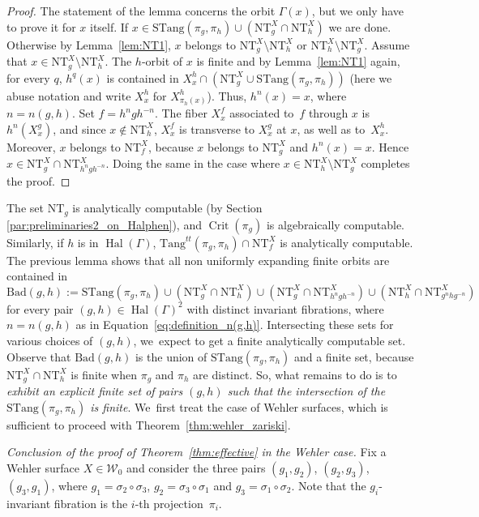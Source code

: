 \documentclass[11pt]{article}
\DeclareMathOperator{\Crit}{Crit}
\DeclareMathOperator{\Hal}{Hal}
\newcommand{\cW}{\mathcal{W}}
\newcommand{\Tang}{{\mathrm{Tang}}}
\newcommand{\STang}{{\mathrm{STang}}}
\newcommand{\NT}{{\mathrm{NT}}}
\theoremstyle{plain}
\theoremstyle{definition}
\numberwithin{equation}{section}
\begin{document}
\begin{proof}
The statement of the lemma concerns the orbit $\Gamma(x)$, but we only have to prove it for $x$ itself.
If $x\in \STang(\pi_g, \pi_h) \cup (\NT_g^X \cap \NT_h^X)$ we are done.
Otherwise by Lemma~\ref{lem:NT1}, $x$ belongs to
$\NT_g^X\setminus \NT_h^X$ or $\NT_h^X\setminus \NT_g^X$.
Assume that $x\in \NT_g^X\setminus \NT_h^X$.
The $h$-orbit of $x$ is finite and by Lemma~\ref{lem:NT1} again,
for every $q$, $h^q(x)$ is contained in
$X^h_{x}\cap (\NT_g^X \cup \STang(\pi_g, \pi_h))$ (here we abuse notation and
write $X^h_{x}$ for $X^h_{\pi_h(x)}$). Thus,
$h^{n}(x) = x$, where $n=n(g,h)$. Set $f = h^{n} g h^{-n}$. The fiber $X^f_x$ associated to~$f$ through $x$
is $h^{n}( X^g_x)$, and since $x\notin \NT_h^X$, $X^f_x$ is transverse to
$X^g_x$ at $x$, as well as to~$X^h_x$. Moreover, $x$ belongs to $\NT_f^X$, because $x$ belongs to $\NT_g^X$ and $h^n(x)=x$. Hence $x\in \NT_g^X\cap \NT_{h^ngh^{-n}}^X$. Doing the same
in the case where $x\in \NT_h^X\setminus \NT_g^X$ completes the proof.
\end{proof}

The set $\NT_g$ is analytically computable (by Section \ref{par:preliminaries2_on_Halphen}), and $\Crit(\pi_g)$ is algebraically computable. Similarly, if $h$ is in $\Hal(\Gamma)$, $\Tang^{tt}(\pi_g,\pi_h)\cap \NT_f^X$ is analytically computable.
The previous lemma
shows that all non uniformly expanding finite orbits are contained in
\[
\mathrm{Bad}(g,h):=\STang(\pi_g, \pi_h) \cup
(\NT_g^X\cap \NT_h^X)\cup (\NT_g^X\cap \NT_{h^n gh^{-n}}^X) \cup (\NT_h^X\cap \NT_{g^nhg^{-n}}^X)
\]
for every pair $(g,h)\in \Hal(\Gamma)^2$ with distinct invariant fibrations, where $n = n(g,h)$ as in Equation~\eqref{eq:definition_n(g,h)}.
Intersecting these sets for various choices of $(g,h)$, we~expect to get a finite analytically computable set.
Observe that $\mathrm{Bad}(g,h)$
is the union of $\STang(\pi_g, \pi_h)$ and a finite set, because $\NT_g^X\cap \NT_h^X$ is finite when $\pi_g$ and $\pi_h$ are distinct. So, what remains to do is to
\textit{exhibit an explicit finite set of pairs $(g,h)$ such that the
intersection of the $\STang(\pi_g, \pi_h)$ is finite}. We~first treat the case of Wehler surfaces,
which is sufficient to proceed with Theorem~\ref{thm:wehler_zariski}.

\smallskip

\noindent \textit{Conclusion of the proof of Theorem~\ref{thm:effective} in the Wehler case.}
Fix a Wehler surface $X\in {\cW}_0$ and consider the three pairs $(g_1, g_2)$, $(g_2,g_3)$, $(g_3,g_1)$, where $g_1 = \sigma_2\circ \sigma_3$, $g_2 = \sigma_3\circ\sigma_1$ and $g_3 =\sigma_1\circ\sigma_2$. Note that the $g_i$-invariant fibration is the $i$-th projection~$\pi_i$.
\end{document}
